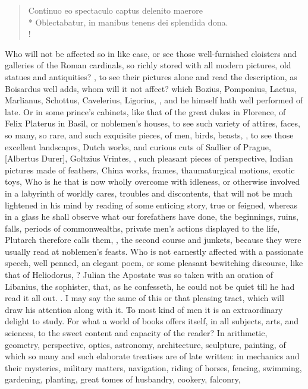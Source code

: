 {\begin{latin}
\begin{verse}%
Continuo eo spectaculo captus delenito maerore\\*
Oblectabatur, in manibus tenens dei splendida dona.\\!
\end{verse}%
\end{latin}

Who will not be affected so in like case, or see those well-furnished cloisters and galleries of the Roman cardinals, so richly stored with all modern pictures, old statues and antiquities? , to see their pictures alone and read the description, as Boisardus well adds, whom will it not affect? which Bozius, Pomponius, Laetus, Marlianus, Schottus, Cavelerius, Ligorius, \etc{}, and he himself hath well performed of late. Or in some prince's cabinets, like that of the great dukes in Florence, of Felix Platerus in Basil, or noblemen's houses, to see such variety of attires, faces, so many, so rare, and such exquisite pieces, of men, birds, beasts, \etc{}, to see those excellent landscapes, Dutch works, and curious cuts of Sadlier of Prague, [Albertus Durer], Goltzius Vrintes, \etc{}, such pleasant pieces of perspective, Indian pictures made of feathers, China works, frames, thaumaturgical motions, exotic toys, \etc{} Who is he that is now wholly overcome with idleness, or otherwise involved in a labyrinth of worldly cares, troubles and discontents, that will not be much lightened in his mind by reading of some enticing story, true or feigned, whereas in a glass he shall observe what our forefathers have done, the beginnings, ruins, falls, periods of commonwealths, private men's actions displayed to the life, \etc{} Plutarch therefore calls them, , the second course and junkets, because they were usually read at noblemen's feasts. Who is not earnestly affected with a passionate speech, well penned, an elegant poem, or some pleasant bewitching discourse, like that of Heliodorus, ? Julian the Apostate was so taken with an oration of Libanius, the sophister, that, as he confesseth, he could not be quiet till he had read it all out. .  I may say the same of this or that pleasing tract, which will draw his attention along with it. To most kind of men it is an extraordinary delight to study. For what a world of books offers itself, in all subjects, arts, and sciences, to the sweet content and capacity of the reader? In arithmetic, geometry, perspective, optics, astronomy, architecture, sculpture, painting, of which so many and such elaborate treatises are of late written: in mechanics and their mysteries, military matters, navigation, riding of horses, fencing, swimming, gardening, planting, great tomes of husbandry, cookery, falconry, }
